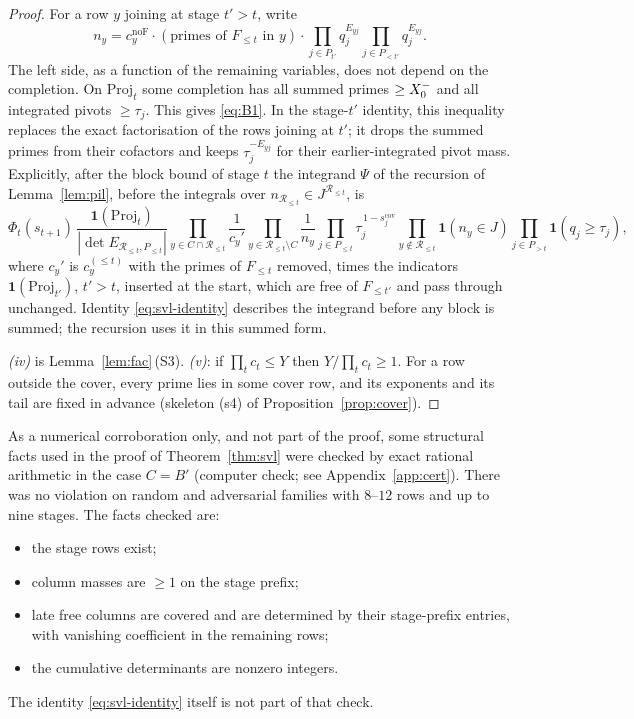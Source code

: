 \begin{proof}
For a row $y$ joining at stage $t'>t$, write
\[
  n_y=c_y^{\mathrm{noF}}\cdot(\text{primes of }F_{\le t}\text{ in }y)\cdot\prod_{j\in P_{t'}}q_j^{E_{yj}}
  \prod_{j\in P_{<t'}}q_j^{E_{yj}} .
\]
The left side, as a function of the remaining variables, does not depend on the completion. On $\mathrm{Proj}_t$ some
completion has all summed primes $\ge X_0^{-}$ and all integrated pivots $\ge\tau_j$. This gives \eqref{eq:B1}. In the
stage-$t'$ identity, this inequality replaces the exact factorisation of the rows joining at $t'$; it drops the summed
primes from their cofactors and keeps $\tau_j^{-E_{yj}}$ for their earlier-integrated pivot mass. Explicitly, after the
block bound of stage $t$ the integrand $\Psi$ of the recursion of Lemma~\ref{lem:pil}, before the integrals over
$n_{\mathcal R_{\le t}}\in J^{\mathcal R_{\le t}}$, is
\[
  \Phi_t(s_{t+1})\,\frac{\mathbf 1(\mathrm{Proj}_t)}{|\det E_{\mathcal R_{\le t},P_{\le t}}|}
  \prod_{y\in C\cap\mathcal R_{\le t}}\frac1{c_y'}\prod_{y\in\mathcal R_{\le t}\setminus C}\frac1{n_y}
  \prod_{j\in P_{\le t}}\tau_j^{\,1-s_j^{\mathrm{cov}}}
  \prod_{y\notin\mathcal R_{\le t}}\mathbf 1(n_y\in J)\prod_{j\in P_{>t}}\mathbf 1(q_j\ge\tau_j),
\]
where $c_y'$ is $c_y^{(\le t)}$ with the primes of $F_{\le t}$ removed, times the indicators $\mathbf 1(\mathrm{Proj}_{t'})$,
$t'>t$, inserted at the start, which are free of $F_{\le t'}$ and pass through unchanged. Identity \eqref{eq:svl-identity} describes the
integrand before any block is summed; the recursion uses it in this summed form.

\emph{(iv)} is Lemma~\ref{lem:fac}\,(S3). \emph{(v)}: if $\prod_tc_t\le Y$ then $Y/\prod_tc_t\ge1$. For a row outside
the cover, every prime lies in some cover row, and its exponents and its tail are fixed in advance (skeleton (s4) of
Proposition~\ref{prop:cover}).
\end{proof}

\begin{remark}
As a numerical corroboration only, and not part of the proof, some structural facts used in the proof of
Theorem~\ref{thm:svl} were checked by exact rational arithmetic in the case $C=B'$ (computer check; see
Appendix~\ref{app:cert}). There was no violation on random and adversarial families with $8$--$12$ rows and up to nine
stages. The facts checked are:
\begin{itemize}
\item the stage rows exist;
\item column masses are $\ge1$ on the stage prefix;
\item late free columns are covered and are determined by their stage-prefix entries, with vanishing coefficient in the
  remaining rows;
\item the cumulative determinants are nonzero integers.
\end{itemize}
The identity \eqref{eq:svl-identity} itself is not part of that check.
\end{remark}

